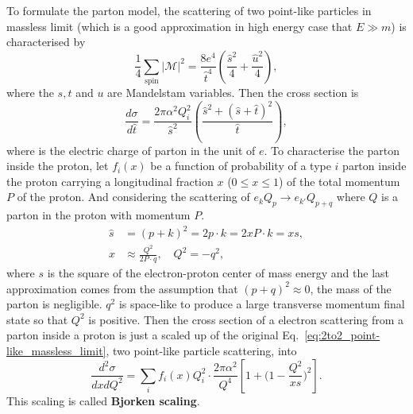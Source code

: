 To formulate the parton model, the scattering of two point-like particles in massless limit (which is a good approximation in high energy case that $E\gg m$) is characterised by
\begin{equation} 
\frac{1}{4}\sum_{\text{spin}}|\mathcal{M}|^2=\frac{8e^4}{\hat t^4}\left(\frac{\hat s^2}{4}+\frac{\hat u^2}{4}\right),
\end{equation}
where the $s,t$ and $u$ are Mandelstam variables. Then the cross section is
\begin{equation}
\frac{d\sigma}{d\hat t}=\frac{2\pi\alpha^2Q_i^2}{\hat s^2}\left(\frac{\hat s^2+(\hat s+\hat t)^2}{\hat t}\right),\label{eq:2to2_point-like_massless_limit}
\end{equation}
where is the electric charge of parton in the unit of $e$. To characterise the parton inside the proton, let $f_i(x)$ be a function of probability of a type $i$ parton inside the proton carrying a longitudinal fraction $x$ ($0\le x\le 1$) of the total momentum $P$ of the proton. And considering the scattering of $e_{k}Q_{p}\to e_{k'}Q_{p+q}$ where $Q$ is a parton in the proton with momentum $P$. 
\begin{equation}
\begin{aligned}
\hat s&= (p+k)^2=2p\cdot k =2xP\cdot k=xs,\\
x &\approx \frac{Q^2}{2P\cdot q},\quad Q^2=-q^2,
\end{aligned}
\end{equation}
where $s$ is the square of the electron-proton center of mass energy and the last approximation comes from the assumption that $(p+q)^2\approx0$, the mass of the parton is negligible. $q^2$ is space-like to produce a large transverse momentum final state so that $Q^2$ is positive. Then the cross section of a electron scattering from a parton inside a proton is just a scaled up of the original Eq.~\ref{eq:2to2_point-like_massless_limit}, two point-like particle scattering, into
\begin{equation}
\frac{d^2\sigma}{dxdQ^2}=\sum_if_i(x)Q^2_i\cdot\frac{2\pi\alpha^2}{Q^4}\left[1+\bigg(1-\frac{Q^2}{xs}\bigg)^2\right].
\end{equation}
This scaling is called \textbf{Bjorken scaling}.